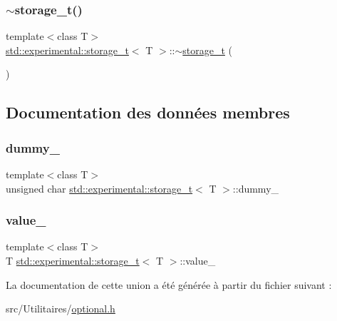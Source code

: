 \subsubsection{\texorpdfstring{$\sim$storage\+\_\+t()}{~storage\_t()}}
{\footnotesize\ttfamily template$<$class T$>$ \\
\hyperlink{unionstd_1_1experimental_1_1storage__t}{std\+::experimental\+::storage\+\_\+t}$<$ T $>$\+::$\sim$\hyperlink{unionstd_1_1experimental_1_1storage__t}{storage\+\_\+t} (\begin{DoxyParamCaption}{ }\end{DoxyParamCaption})\hspace{0.3cm}{\ttfamily [inline]}}



\subsection{Documentation des données membres}
\mbox{\label{unionstd_1_1experimental_1_1storage__t_a66c46e8a91805a1495127fa280a3f58a}} 
\subsubsection{\texorpdfstring{dummy\+\_\+}{dummy\_}}
{\footnotesize\ttfamily template$<$class T$>$ \\
unsigned char \hyperlink{unionstd_1_1experimental_1_1storage__t}{std\+::experimental\+::storage\+\_\+t}$<$ T $>$\+::dummy\+\_\+}

\mbox{\label{unionstd_1_1experimental_1_1storage__t_afc411a630487df07bf6278ebbef1ebb7}} 
\subsubsection{\texorpdfstring{value\+\_\+}{value\_}}
{\footnotesize\ttfamily template$<$class T$>$ \\
T \hyperlink{unionstd_1_1experimental_1_1storage__t}{std\+::experimental\+::storage\+\_\+t}$<$ T $>$\+::value\+\_\+}



La documentation de cette union a été générée à partir du fichier suivant \+:\begin{DoxyCompactItemize}
\item 
src/\+Utilitaires/\hyperlink{optional_8h}{optional.\+h}\end{DoxyCompactItemize}
